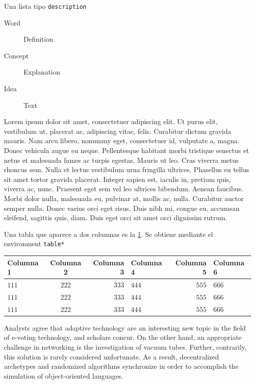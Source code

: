 \documentclass[10pt,twoside]{rcmart} %
\begin{document}
Una lista tipo \texttt{description}
\begin{description}
\item[Word] Definition
\item[Concept] Explanation
\item[Idea] Text
\end{description}
Lorem ipsum dolor sit amet, consectetuer adipiscing elit. Ut purus elit, vestibulum ut, placerat ac, adipiscing vitae, felis. Curabitur dictum gravida mauris. Nam arcu libero, nonummy eget, consectetuer id, vulputate a, magna. Donec vehicula augue eu neque. Pellentesque habitant morbi tristique senectus et netus et malesuada fames ac turpis egestas. Mauris ut leo. Cras viverra metus rhoncus sem. Nulla et lectus vestibulum urna fringilla ultrices. Phasellus eu tellus sit amet tortor gravida placerat. Integer sapien est, iaculis in, pretium quis, viverra ac, nunc. Praesent eget sem vel leo ultrices bibendum. Aenean faucibus. Morbi dolor nulla, malesuada eu, pulvinar at, mollis ac, nulla. Curabitur auctor semper nulla. Donec varius orci eget risus. Duis nibh mi, congue eu, accumsan eleifend, sagittis quis, diam. Duis eget orci sit amet orci dignissim rutrum.

Una tabla que aparece a dos columnas es la \ref{tab:label2}. Se obtiene mediante el environment \texttt{table*}

\begin{table}[hbt]
\begin{center}
\begin{tabular}
[c]{lcrlrl}\hline\hline
Columna 1 & Columna 2 & Columna 3 & Columna 4 & Columna 5 & Columna
6\\\hline\hline
$111$ & $222$ & $333$ & $444$ & $555$ & $666$\\
$111$ & $222$ & $333$ & $444$ & $555$ & $666$\\
$111$ & $222$ & $333$ & $444$ & $555$ & $666$\\\hline\hline
\end{tabular}
\end{center}
\label{tab:label2}
\end{table}

Analysts agree that adaptive technology are an interesting new topic in the field of e-voting technology, and scholars concur. On the other hand, an appropriate challenge in networking is the investigation of vacuum tubes. Further, contrarily, this solution is rarely considered
unfortunate. As a result, decentralized archetypes and randomized algorithms  synchronize in order to accomplish the simulation of object-oriented languages.
\end{document}
